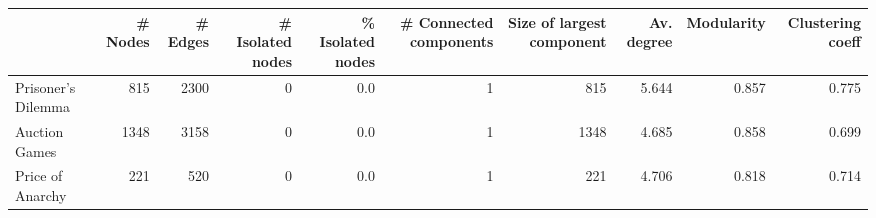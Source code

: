 \begin{tabular}{lrrrrrrrrr}
\toprule
{} &  \# Nodes &  \# Edges &  \# Isolated nodes &  \% Isolated nodes &  \# Connected components &  Size of largest component &  Av. degree &  Modularity &  Clustering coeff \\
\midrule
Prisoner's Dilemma &      815 &     2300 &                 0 &               0.0 &                       1 &                        815 &       5.644 &       0.857 &             0.775 \\
Auction Games      &     1348 &     3158 &                 0 &               0.0 &                       1 &                       1348 &       4.685 &       0.858 &             0.699 \\
Price of Anarchy   &      221 &      520 &                 0 &               0.0 &                       1 &                        221 &       4.706 &       0.818 &             0.714 \\
\bottomrule
\end{tabular}
